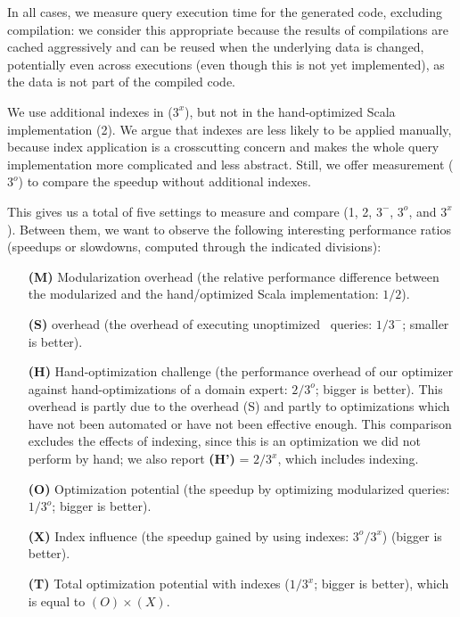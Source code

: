 In all cases, we measure query execution time for the generated code, excluding compilation: we consider this appropriate because the results of compilations are cached aggressively and can be reused when the underlying data is changed, potentially even across executions (even though this is not yet implemented), as the data is not part of the compiled code.

We use additional indexes in ($3^x$), but not in the hand-optimized Scala implementation (2). We argue that indexes are less likely to be applied manually, because index application is a crosscutting concern and makes the whole query implementation more complicated and less abstract.
Still, we offer measurement ($3^o$) to compare the speedup without additional indexes.


This gives us a total of five settings to measure and compare (1, 2, $3^-$, $3^o$, and $3^x$). Between them, we want to observe the following interesting performance ratios (speedups or slowdowns, computed through the indicated divisions):
\begin{enumerate}
	\item[\textbf{(M)}] Modularization overhead (the relative performance difference between the modularized and the hand\-/optimized Scala implementation: $1/2$).
	\item[\textbf{(S)}] \LoS{} overhead (the overhead of executing unoptimized \LoS\ queries: $1/3^-$; smaller is better).
	\item[\textbf{(H)}] Hand-optimization challenge (the performance overhead of our optimizer against hand-optimizations of a domain expert: $2/3^o$; bigger is better). This overhead is partly due to the \LoS{} overhead (S) and partly to optimizations which have not been automated or have not been effective enough.
	This comparison excludes the effects of indexing, since this is an optimization we did not perform by hand; we also report \textbf{(H')} = $2/3^x$, which includes indexing.
	\item[\textbf{(O)}] Optimization potential (the speedup by optimizing modularized queries: $1/3^o$; bigger is better).
	\item[\textbf{(X)}] Index influence (the speedup gained by using indexes: $3^o/3^x$) (bigger is better).
	\item[\textbf{(T)}] Total optimization potential with indexes ($1/3^x$; bigger is better), which is equal to $(O) \times (X)$.
\end{enumerate}

